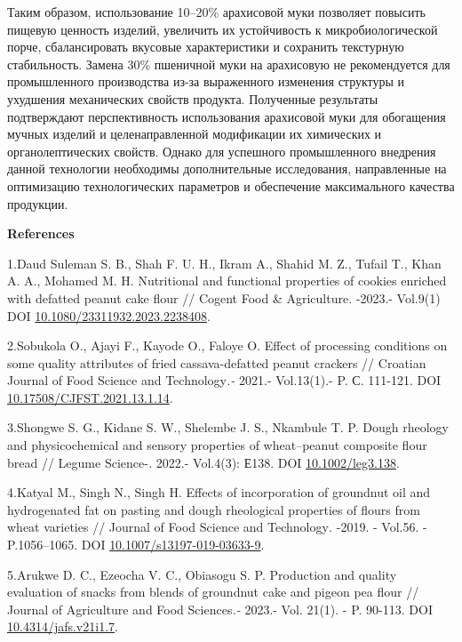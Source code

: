 {{{Таким образом, использование 10--20\% арахисовой муки позволяет повысить
пищевую ценность изделий, увеличить их устойчивость к микробиологической
порче, сбалансировать вкусовые характеристики и сохранить текстурную
стабильность. Замена 30\% пшеничной муки на арахисовую не рекомендуется
для промышленного производства из-за выраженного изменения структуры и
ухудшения механических свойств продукта. Полученные результаты
подтверждают перспективность использования арахисовой муки для
обогащения мучных изделий и целенаправленной модификации их химических и
органолептических свойств. Однако для успешного промышленного внедрения
данной технологии необходимы дополнительные исследования, направленные
на оптимизацию технологических параметров и обеспечение максимального
качества продукции.

{\bfseries References}

1.Daud Suleman S. B., Shah F. U. H., Ikram A., Shahid M. Z., Tufail T.,
Khan A. A., Mohamed M. H. Nutritional and functional properties of
cookies enriched with defatted peanut cake flour // Cogent Food \&
Agriculture. -2023.- Vol.9(1) DOI
\href{https://doi.org/10.1080/23311932.2023.2238408}{10.1080/23311932.2023.2238408}.

2.Sobukola O., Ajayi F., Kayode O., Faloye O. Effect of processing
conditions on some quality attributes of fried cassava-defatted peanut
crackers // Croatian Journal of Food Science and Technology\emph{.-}
2021.- Vol.13(1).- P. С. 111-121. DOI
\href{https://doi.org/10.17508/CJFST.2021.13.1.14}{10.17508/CJFST.2021.13.1.14}.

3.Shongwe S. G., Kidane S. W., Shelembe J. S., Nkambule T. P. Dough
rheology and physicochemical and sensory properties of wheat--peanut
composite flour bread // Legume Science-\emph{.} 2022.- Vol.4(3): Е138.
DOI \href{https://doi.org/10.1002/leg3.138}{10.1002/leg3.138}.

4.Katyal M., Singh N., Singh H. Effects of incorporation of groundnut
oil and hydrogenated fat on pasting and dough rheological properties of
flours from wheat varieties // Journal of Food Science and
Technology\emph{.} -2019. - Vol.56. - P.1056--1065. DOI
\href{https://doi.org/10.1007/s13197-019-03633-9}{10.1007/s13197-019-03633-9}.

5.Arukwe D. C., Ezeocha V. C., Obiasogu S. P. Production and quality
evaluation of snacks from blends of groundnut cake and pigeon pea flour
// Journal of Agriculture and Food Sciences\emph{.-} 2023.- Vol. 21(1).
- P. 90-113. DOI
\href{https://doi.org/10.4314/jafs.v21i1.7}{10.4314/jafs.v21i1.7}.

}}}

